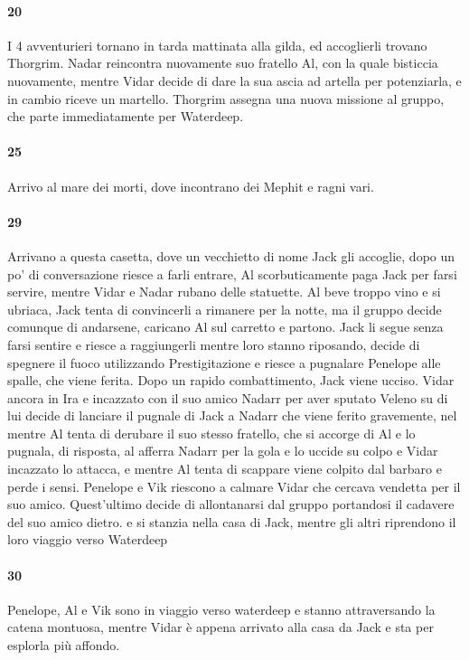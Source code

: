 \documentclass{article}
\begin{document}
                  \paragraph{20}
I 4 avventurieri tornano in tarda mattinata alla gilda, ed accoglierli trovano Thorgrim. Nadar reincontra nuovamente suo fratello Al, con la quale bisticcia nuovamente, mentre Vidar decide di dare la sua ascia ad artella per potenziarla, e in cambio riceve un martello. Thorgrim assegna una nuova missione al gruppo, che parte immediatamente per Waterdeep. 
                  \paragraph{25} Arrivo al mare dei morti, dove incontrano dei Mephit e ragni vari. 
                  \paragraph{29} Arrivano a questa casetta, dove un vecchietto di nome Jack gli accoglie, dopo un po' di conversazione riesce a farli entrare, Al scorbuticamente paga Jack per farsi servire, mentre Vidar e Nadar rubano delle statuette. Al beve troppo vino e si ubriaca, Jack tenta di convincerli a rimanere per la notte, ma il gruppo decide comunque di andarsene, caricano Al sul carretto e partono. Jack li segue senza farsi sentire e riesce a raggiungerli mentre loro stanno riposando, decide di spegnere il fuoco utilizzando Prestigitazione e riesce a pugnalare Penelope alle spalle, che viene ferita. Dopo un rapido combattimento, Jack viene ucciso.
Vidar ancora in Ira e incazzato con il suo amico Nadarr per aver sputato Veleno su di lui decide di lanciare il pugnale di Jack a Nadarr che viene ferito gravemente, nel mentre Al tenta di derubare il suo stesso fratello, che si accorge di Al e lo pugnala, di risposta, al afferra Nadarr per la gola e lo uccide su colpo e Vidar incazzato lo attacca, e mentre Al tenta di scappare viene colpito dal barbaro e perde i sensi. Penelope e Vik riescono a calmare Vidar che cercava vendetta per il suo amico. Quest'ultimo decide di allontanarsi dal gruppo portandosi il cadavere del suo amico dietro.  e si stanzia nella casa di Jack, mentre gli altri riprendono il loro viaggio verso Waterdeep
                  \paragraph{30} Penelope, Al e Vik sono in viaggio verso waterdeep e stanno attraversando la catena montuosa, mentre Vidar è appena arrivato alla casa da Jack e sta per esplorla più affondo.
\end{document}
